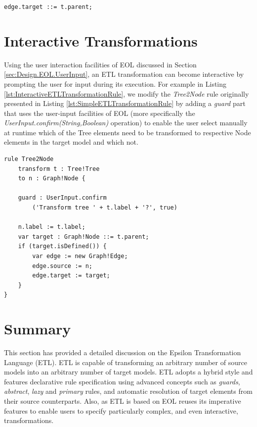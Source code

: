 \begin{lstlisting}[basicstyle=\ttfamily\footnotesize, flexiblecolumns=true, numbers=none, nolol=true, caption=Rewritten Line 10 of the \emph{Tree2Node} Rule Demonstrated in Listing \ref{lst:SimpleETLTransformationRule}, label=lst:SpecialAssignmentETLTransformationRule, numbers=left, language=ETL, tabsize=2]
edge.target ::= t.parent;
\end{lstlisting}


\section{Interactive Transformations}
\label{sec:InteractiveModelTransformation}

Using the user interaction facilities of EOL discussed in Section \ref{sec:Design.EOL.UserInput}, an ETL transformation can become interactive by prompting the user for input during its execution. For example in Listing \ref{lst:InteractiveETLTransformationRule}, we modify the \emph{Tree2Node} rule originally presented in Listing \ref{lst:SimpleETLTransformationRule} by adding a \emph{guard} part that uses the user-input facilities of EOL (more specifically the \emph{UserInput.confirm(String,Boolean)} operation) to enable the user select manually at runtime which of the Tree elements need to be transformed to respective Node elements in the target model and which not. 

\begin{lstlisting}[basicstyle=\ttfamily\footnotesize, flexiblecolumns=true, numbers=none, nolol=true, caption=Exemplar Interactive ETL Transformation, label=lst:InteractiveETLTransformationRule, numbers=left, language=ETL, tabsize=2]
rule Tree2Node
	transform t : Tree!Tree
	to n : Graph!Node {
	
	guard : UserInput.confirm
		('Transform tree ' + t.label + '?', true)
	
	n.label := t.label;
	var target : Graph!Node ::= t.parent;
	if (target.isDefined()) {
		var edge := new Graph!Edge;
		edge.source := n;
		edge.target := target;
	}
}
\end{lstlisting}

\section{Summary}

This section has provided a detailed discussion on the Epsilon Transformation Language (ETL). ETL is capable of transforming an arbitrary number of source models into an arbitrary number of target models. ETL adopts a hybrid style and features declarative rule specification using advanced concepts such as \emph{guards}, \emph{abstract}, \emph{lazy} and \emph{primary} rules, and automatic resolution of target elements from their source counterparts. Also, as ETL is based on EOL reuses its imperative features to enable users to specify particularly complex, and even interactive, transformations.